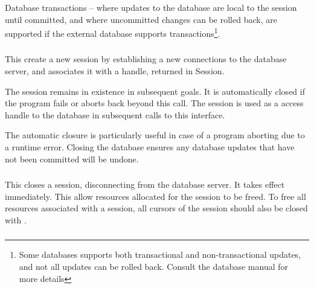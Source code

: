 Database transactions -- where updates to the database are local to the
session until committed, and where uncommitted changes can be rolled back, 
are supported if the external database supports transactions\footnote{Some
databases supports both transactional and non-transactional updates,
and not all updates can be rolled back. Consult the database manual for
more details}. 

\subsubsection{}
\label{session-start/3}

This create a new session by establishing a new connections to the
database server, and associates it with a handle,
returned in Session.

The session remains in existence in subsequent goals. It is automatically
closed if the program fails or aborts back beyond this call. The session
is used as a access handle to the database in subsequent calls to this
interface.

The automatic closure is particularly useful in case of a
program aborting due to a runtime error. Closing the database ensures
any database updates that have not been committed will be undone.


\subsubsection{}
\label{session-close/1}

This closes a session, disconnecting from the database server. It
takes effect immediately. This allow resources allocated for the
session to be freed. To free all resources associated with a session,
all cursors of the session should also be closed with
. 


\subsubsection{}
\label{session-commit/1}

